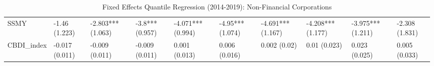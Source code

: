\begin{table}[H]
\begin{adjustbox}{totalheight=3in, width=\columnwidth }
\begin{subtable}[c]{1.1\textwidth}
{\begin{tabular}{llllllllll}
  SSMY & -1.46 (1.223) & -2.803*** (1.063) & -3.8*** (0.957) & -4.071*** (0.994) & -4.95*** (1.074) & -4.691*** (1.167) & -4.208*** (1.177) & -3.975*** (1.211) & -2.308 (1.831) \\ 
  CBDI\_index & -0.017 (0.011) & -0.009 (0.011) & -0.009 (0.011) & 0.001 (0.013) & 0.006 (0.016) & 0.002 (0.02) & 0.01 (0.023) & 0.023 (0.025) & 0.005 (0.033) \\ 
   \bottomrule
\end{tabular}}
\end{subtable}
\end{adjustbox}
\caption{Fixed Effects Quantile Regression (2014-2019): Non-Financial Corporations} 
\label{qrfe_npl_nfi}
\end{table}

